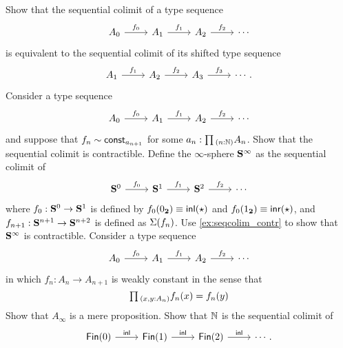 \begin{exercises}
\exercise \label{ex:seqcolim_shift}
Show that the sequential colimit of a type sequence
\begin{equation*}
\begin{tikzcd}
A_0 \arrow[r,"f_0"] & A_1 \arrow[r,"f_1"] & A_2 \arrow[r,"f_2"] & \cdots
\end{tikzcd}
\end{equation*}
is equivalent to the sequential colimit of its shifted type sequence
\begin{equation*}
\begin{tikzcd}
A_1 \arrow[r,"f_1"] & A_2 \arrow[r,"f_2"] & A_3 \arrow[r,"f_3"] & \cdots.
\end{tikzcd}
\end{equation*}
\exercise \label{ex:seqcolim_contr}Consider a type sequence
\begin{equation*}
\begin{tikzcd}
A_0 \arrow[r,"f_0"] & A_1 \arrow[r,"f_1"] & A_2 \arrow[r,"f_2"] & \cdots
\end{tikzcd}
\end{equation*}
and suppose that $f_n\sim \mathsf{const}_{a_{n+1}}$ for some $a_n:\prd{n:\N}A_n$. Show that the sequential colimit is contractible.
\exercise Define the $\infty$-sphere $\mathbf{S}^{\infty}$ as the sequential colimit of
\begin{equation*}
\begin{tikzcd}
\sphere{0} \arrow[r,"f_0"] & \sphere{1} \arrow[r,"f_1"] & \sphere{2} \arrow[r,"f_2"] & \cdots
\end{tikzcd}
\end{equation*}
where $f_0:\mathbf{S}^{0}\to\mathbf{S}^{1}$ is defined by $f_0({0_{\mathbf{2}}})\equiv {\mathsf{inl}}(\star)$ and $f_0({1_{\mathbf{2}}})\equiv {\mathsf{inr}}(\star)$, and $f_{n+1}:\mathbf{S}^{n+1}\to\mathbf{S}^{n+2}$ is defined as $\Sigma(f_n)$. Use \cref{ex:seqcolim_contr} to show that $\mathbf{S}^{\infty}$ is contractible.
\exercise Consider a type sequence
\begin{equation*}
\begin{tikzcd}
A_0 \arrow[r,"f_0"] & A_1 \arrow[r,"f_1"] & A_2 \arrow[r,"f_2"] & \cdots
\end{tikzcd}
\end{equation*}
in which $f_n:A_n\to A_{n+1}$ is weakly constant in the sense that
\begin{equation*}
\prd{x,y:A_n} f_n(x)=f_n(y)
\end{equation*}
Show that $A_\infty$ is a mere proposition.
\exercise Show that ${\mathbb{N}}$ is the sequential colimit of
\begin{equation*}
  \begin{tikzcd}
    \Fin(0) \arrow[r,"\inl"] & \Fin(1) \arrow[r,"\inl"] & \Fin(2) \arrow[r,"\inl"] & \cdots.
  \end{tikzcd}
\end{equation*}
\end{exercises}
